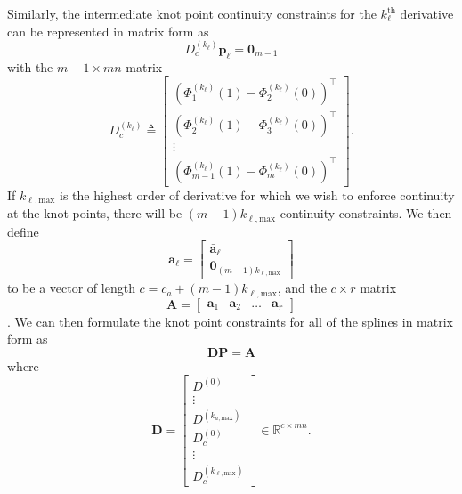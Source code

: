 Similarly, the intermediate knot point continuity constraints for the $k_\ell^\text{th}$ derivative can be represented in matrix form as
\begin{equation}
	D_c^{(k_\ell)} \mathbf{p}_\ell = \mathbf{0}_{m-1}
\end{equation}
with the $m-1 \times mn$ matrix
\begin{equation}
	D_c^{(k_\ell)} \triangleq \begin{bmatrix}
		(\Phi^{(k_\ell)}_1 (1) - \Phi^{(k_\ell)}_{2} (0))^\top \\
		(\Phi^{(k_\ell)}_2 (1) - \Phi^{(k_\ell)}_{3} (0))^\top \\
		\vdots \\
		(\Phi^{(k_\ell)}_{m-1} (1) - \Phi^{(k_\ell)}_{m} (0))^\top 
	\end{bmatrix}.
\end{equation}
If $k_{\ell,\text{max}}$ is the highest order of derivative for which we wish to enforce continuity at the knot points,
there will be $(m-1) k_{\ell,\text{max}}$ continuity constraints. 
We then define
\begin{equation}
	\mathbf{a}_\ell = \begin{bmatrix} \bar{\mathbf{a}}_\ell \\ \mathbf{0}_{(m-1)k_{\ell,\text{max}}} \end{bmatrix}
\end{equation}
to be a vector of length $c = c_a + (m-1)k_{\ell,\text{max}}$, and the $c \times r$ matrix
\begin{equation}
\mathbf{A} = \begin{bmatrix} \mathbf{a}_1 & \mathbf{a}_2 & \dots & \mathbf{a}_r \end{bmatrix}
\end{equation}.  
We can then formulate the knot point constraints for all of the splines in matrix form as
\begin{equation}
	\label{eq:knot_con}
	\mathbf{D} \mathbf{P} = \mathbf{A}
\end{equation}
where
\begin{equation}
	\mathbf{D} = 
	\begin{bmatrix}
		D^{(0)}\\
		\vdots \\
		D^{(k_{a,\text{max}})}\\
		D_c^{(0)} \\
		\vdots\\
		D_c^{(k_{\ell, \text{max}})}
	\end{bmatrix} \in \mathbb{R}^{c \times mn}.
\end{equation}

